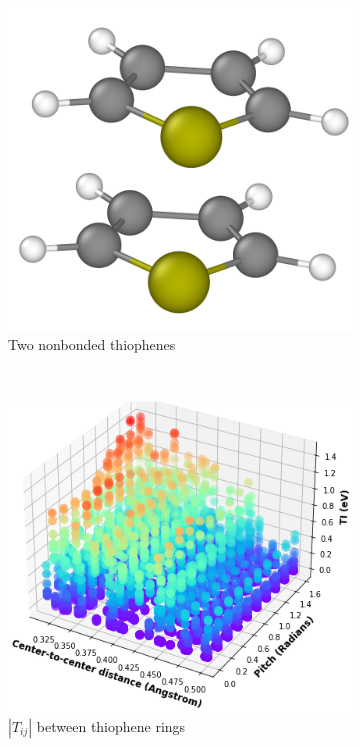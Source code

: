 \begin{figure}[]
\centering
\begin{subfigure}{.4\textwidth}
    \centering
    \includegraphics[width=\textwidth]{figures/thiophene.png}
    \caption{Two nonbonded thiophenes}
\end{subfigure}%
\\[2.0ex]
\begin{subfigure}{.8\textwidth}
    \centering
    \includegraphics[width=\textwidth]{figures/transfer_integral_plot.png}
    \caption{$|T_{ij}|$ between thiophene rings}
\end{subfigure}
\caption{}
\label{TIplots}
\end{figure}

